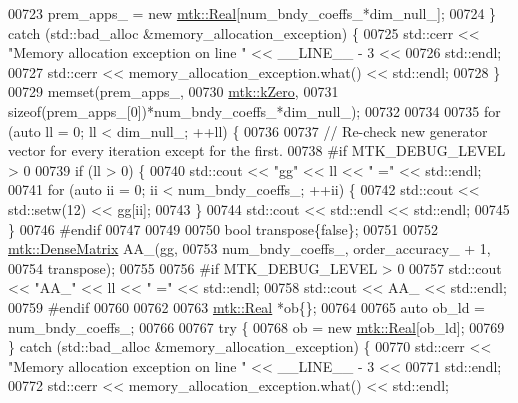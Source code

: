 \begin{DoxyCode}
{{00723     prem\_apps\_ = \textcolor{keyword}{new} \hyperlink{group__c01-roots_gac080bbbf5cbb5502c9f00405f894857d}{mtk::Real}[num\_bndy\_coeffs\_*dim\_null\_];
00724   \} \textcolor{keywordflow}{catch} (std::bad\_alloc &memory\_allocation\_exception) \{
00725     std::cerr << \textcolor{stringliteral}{"Memory allocation exception on line "} << \_\_LINE\_\_ - 3 <<
00726 std::endl;
00727     std::cerr << memory\_allocation\_exception.what() << std::endl;
00728   \}
00729   memset(prem\_apps\_,
00730          \hyperlink{group__c01-roots_ga59a451a5fae30d59649bcda274fea271}{mtk::kZero},
00731          \textcolor{keyword}{sizeof}(prem\_apps\_[0])*num\_bndy\_coeffs\_*dim\_null\_);
00732 
00734 
00735   \textcolor{keywordflow}{for} (\textcolor{keyword}{auto} ll = 0; ll < dim\_null\_; ++ll) \{
00736 
00737     \textcolor{comment}{// Re-check new generator vector for every iteration except for the first.}
00738 \textcolor{preprocessor}{    #if MTK\_DEBUG\_LEVEL > 0}
00739     \textcolor{keywordflow}{if} (ll > 0) \{
00740       std::cout << \textcolor{stringliteral}{"gg"} << ll << \textcolor{stringliteral}{" ="} << std::endl;
00741       \textcolor{keywordflow}{for} (\textcolor{keyword}{auto} ii = 0; ii < num\_bndy\_coeffs\_; ++ii) \{
00742         std::cout << std::setw(12) << gg[ii];
00743       \}
00744       std::cout << std::endl << std::endl;
00745     \}
00746 \textcolor{preprocessor}{    #endif}
00747 
00749 
00750     \textcolor{keywordtype}{bool} transpose\{\textcolor{keyword}{false}\};
00751 
00752     \hyperlink{classmtk_1_1DenseMatrix}{mtk::DenseMatrix} AA\_(gg,
00753                          num\_bndy\_coeffs\_, order\_accuracy\_ + 1,
00754                          transpose);
00755 
00756 \textcolor{preprocessor}{    #if MTK\_DEBUG\_LEVEL > 0}
00757     std::cout << \textcolor{stringliteral}{"AA\_"} << ll << \textcolor{stringliteral}{" ="} << std::endl;
00758     std::cout << AA\_ << std::endl;
00759 \textcolor{preprocessor}{    #endif}
00760 
00762 
00763     \hyperlink{group__c01-roots_gac080bbbf5cbb5502c9f00405f894857d}{mtk::Real} *ob\{\};
00764 
00765     \textcolor{keyword}{auto} ob\_ld = num\_bndy\_coeffs\_;
00766 
00767     \textcolor{keywordflow}{try} \{
00768       ob = \textcolor{keyword}{new} \hyperlink{group__c01-roots_gac080bbbf5cbb5502c9f00405f894857d}{mtk::Real}[ob\_ld];
00769     \} \textcolor{keywordflow}{catch} (std::bad\_alloc &memory\_allocation\_exception) \{
00770       std::cerr << \textcolor{stringliteral}{"Memory allocation exception on line "} << \_\_LINE\_\_ - 3 <<
00771         std::endl;
00772       std::cerr << memory\_allocation\_exception.what() << std::endl;
}}
\end{DoxyCode}
